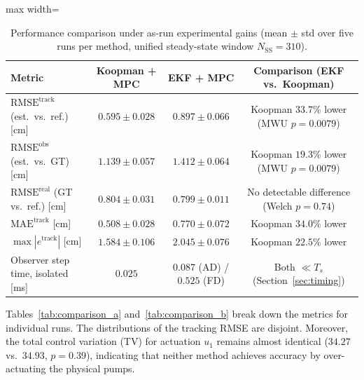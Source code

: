 \documentclass[asi,article,accept,pdftex,moreauthors]{Definitions/mdpi}
\begin{document}
\begin{table}[H]
  \caption{{Performance comparison under as-run experimental gains (mean $\pm$ std over five runs per method, unified steady-state window $N_\mathrm{SS}=310$).}}
  \label{tab:summary}
  \begin{adjustbox}{max width=\linewidth}
  \begin{tabular}{lccc}
    \toprule
    \textbf{Metric} & \textbf{Koopman +
 MPC} & \textbf{EKF + MPC} & \textbf{Comparison (EKF vs.\ Koopman)} \\
    \midrule
    $\mathrm{RMSE}^\mathrm{track}$ (est.\ vs.\ ref.) [cm] & $0.595\pm0.028$ & $0.897\pm0.066$ & Koopman $33.7\%$ lower (MWU $p=0.0079$) \\
    $\mathrm{RMSE}^\mathrm{obs}$ (est.\ vs.\ GT) [cm]    & $1.139\pm0.057$ & $1.412\pm0.064$ & Koopman $19.3\%$ lower (MWU $p=0.0079$) \\
    $\mathrm{RMSE}^\mathrm{real}$ (GT vs.\ ref.) [cm]    & $0.804\pm0.031$ & $0.799\pm0.011$ & No detectable difference (Welch $p=0.74$) \\
    $\mathrm{MAE}^\mathrm{track}$ [cm]                   & $0.508\pm0.028$ & $0.770\pm0.072$ & Koopman $34.0\%$ lower \\
    $\max|e^\mathrm{track}|$ [cm]                        & $1.584\pm0.106$ & $2.045\pm0.076$ & Koopman $22.5\%$ lower \\
    {Observer step time, isolated [ms]}  & {$0.025$} & {$0.087$ (AD) / $0.525$ (FD)} & {Both $\ll T_s$ (Section~\ref{sec:timing})} \\
    \bottomrule
  \end{tabular}
  \end{adjustbox}
\end{table}

Tables~\ref{tab:comparison_a} and~\ref{tab:comparison_b} break down the metrics for individual runs. The distributions of the tracking RMSE are disjoint. Moreover, the total control variation (TV) for actuation $u_1$ remains almost identical ($34.27$ vs.\ $34.93$, $p=0.39$), {indicating} that neither method achieves accuracy by over-actuating the physical pumps.
\end{document}
